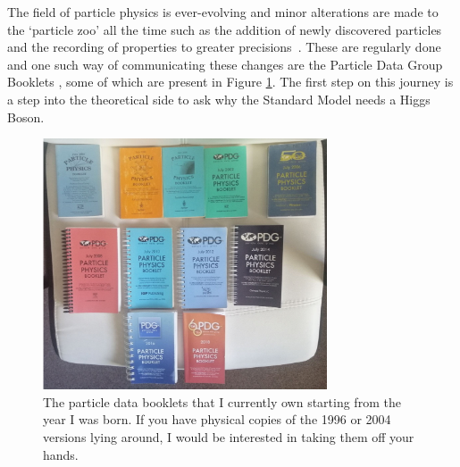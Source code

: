 The field of particle physics is ever-evolving and minor alterations are made to the \SM `particle zoo' all the time such as the addition of newly discovered particles and the recording of properties to greater precisions~\cite{PDG2018Booklet,PDG2016Booklet,PDG2014Booklet,PDG2012Booklet,
PDG2010Booklet,PDG2008Booklet,PDG2006Booklet,PDG2002Booklet,
PDG2000Booklet,PDG1998Booklet,PDG1994Booklet}. These are regularly done and one such way of communicating these changes are the Particle Data Group Booklets , some of which are present in Figure \ref{fig:booklets}. The first step on this journey is a step into the theoretical side to ask why the Standard Model needs a Higgs Boson.
\begin{figure}[htbp]
	\centering
	\includegraphics[width=0.75\textwidth]{Introduction/PDGs.png}
	\caption[The particle data booklets that I currently own.]{The particle data booklets that I currently own starting from the year I was born. If you have physical copies of the 1996 or 2004 versions lying around, I would be interested in taking them off your hands.}
	\label{fig:booklets}
\end{figure}